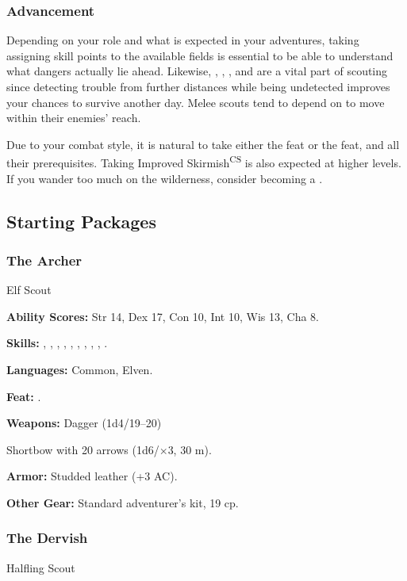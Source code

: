 \subsubsection{Advancement}
Depending on your role and what is expected in your adventures, taking assigning skill points to the available  fields is essential to be able to understand what dangers actually lie ahead. Likewise, , , , and  are a vital part of scouting since detecting trouble from further distances while being undetected improves your chances to survive another day. Melee scouts tend to depend on  to move within their enemies' reach.

Due to your combat style, it is natural to take either the  feat or the  feat, and all their prerequisites. Taking Improved Skirmish\textsuperscript{CS} is also expected at higher levels. If you wander too much on the wilderness, consider becoming a .

\subsection{Starting Packages}
\subsubsection{The Archer}
Elf Scout

\textbf{Ability Scores:} Str 14, Dex 17, Con 10, Int 10, Wis 13, Cha 8.

\textbf{Skills:} , , , , , , , , , .

\textbf{Languages:} Common, Elven.

\textbf{Feat:} .

\textbf{Weapons:} Dagger (1d4/19--20)

Shortbow with 20 arrows (1d6/$\times$3, 30 m).

\textbf{Armor:} Studded leather (+3 AC).

\textbf{Other Gear:} Standard adventurer's kit, 19 cp.

\subsubsection{The Dervish}
Halfling Scout

